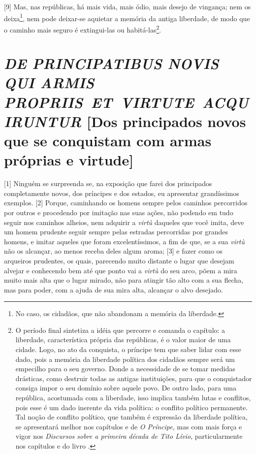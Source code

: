 {[}9{]} Mas, nas repúblicas, há mais vida, mais ódio, mais desejo de
vingança; nem os deixa\footnote{No caso, os cidadãos, que não abandonam
  a memória da liberdade.}, nem pode deixar-se aquietar a memória da
antiga liberdade, de modo que o caminho mais seguro é extingui-las ou
habitá-las\footnote{O período final sintetiza a idéia que percorre e
  comanda o capítulo: a liberdade, característica própria das
  repúblicas, é o valor maior de uma cidade. Logo, no ato da conquista,
  o príncipe tem que saber lidar com esse dado, pois a memória da
  liberdade política dos cidadãos sempre será um empecilho para o seu
  governo. Donde a necessidade de se tomar medidas drásticas, como
  destruir todas as antigas instituições, para que o conquistador
  consiga impor o seu domínio sobre aquele povo. De outro lado, para uma
  república, acostumada com a liberdade, isso implica também lutas e
  conflitos, pois esse é um dado inerente da vida política: o conflito
  político permanente. Tal noção de conflito político, que também é
  expressão da liberdade política, se apresentará melhor nos capítulos
   e  de \emph{O Príncipe}, mas com mais força e vigor nos
  \emph{Discursos sobre a primeira década de Tito Lívio},
  particularmente nos capítulos  e  do livro .}.

\quebra\section{\emph{DE PRINCIPATIBUS NOVIS QUI ARMIS PROPRIIS~ET~VIRTUTE~ACQUIRUNTUR}\break
{[}Dos principados novos que se conquistam com armas próprias e virtude{]}}

{[}1{]} Ninguém se surpreenda se, na exposição que farei dos principados
completamente novos, dos príncipes e dos estados, eu apresentar
grandíssimos exemplos. {[}2{]} Porque, caminhando os homens sempre pelos
caminhos percorridos por outros e procedendo por imitação nas suas
ações, não podendo em tudo seguir nos caminhos alheios, nem adquirir a
\emph{virtù} daqueles que você imita, deve um homem prudente seguir
sempre pelas estradas percorridas por grandes homens, e imitar aqueles
que foram excelentíssimos, a fim de que, se a sua \emph{virtù} não os
alcançar, ao menos receba deles algum aroma; {[}3{]} e fazer como os
arqueiros prudentes, os quais, parecendo muito distante o lugar que
desejam alvejar e conhecendo bem até que ponto vai a \emph{virtù} do seu
arco, põem a mira muito mais alta que o lugar mirado, não para atingir
tão alto com a sua flecha, mas para poder, com a ajuda de sua mira alta,
alcançar o alvo desejado.

